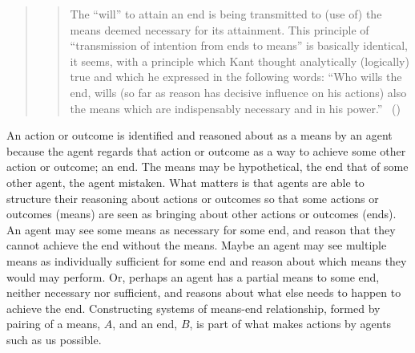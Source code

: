 \documentclass[10pt]{article}
\begin{document}
\begin{quote}
{\begin{quote}
  The ``will'' to attain an end is being transmitted to (use of) the means deemed necessary for its attainment.
  This principle of ``transmission of intention from ends to means'' is basically identical, it seems, with a principle which Kant thought analytically (logically) true and which he expressed in the following words:
  ``Who wills the end, wills (so far as reason has decisive influence on his actions) also the means which are indispensably necessary and in his power.''\nolinebreak
  \mbox{ }\hfill(\cite[45pdf]{Von-Wright:1972aa})
\end{quote}
}
\end{quote}


An action or outcome is identified and reasoned about as a means by an agent because the agent regards that action or outcome as a way to achieve some other action or outcome; an end.
The means may be hypothetical, the end that of some other agent, the agent mistaken.
What matters is that agents are able to structure their reasoning about actions or outcomes so that some actions or outcomes (means) are seen as bringing about other actions or outcomes (ends).
An agent may see some means as necessary for some end, and reason that they cannot achieve the end without the means.
Maybe an agent may see multiple means as individually sufficient for some end and reason about which means they would may perform.
Or, perhaps an agent has a partial means to some end, neither necessary nor sufficient, and reasons about what else needs to happen to achieve the end.
Constructing systems of means-end relationship, formed by pairing of a means, \(A\), and an end, \(B\), is part of what makes actions by agents such as us possible.
\end{document}
